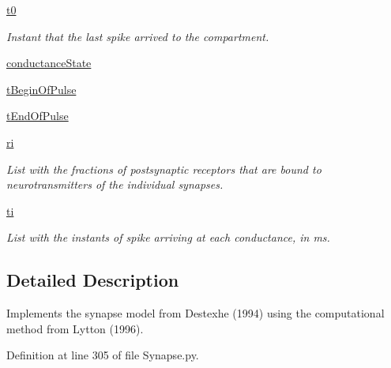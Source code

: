 \begin{DoxyCompactItemize}
\hyperlink{class_synapse_1_1_synapse_ad0adf1cb832bd7ce7918f2779171d7d7}{t0}
\begin{DoxyCompactList}\small\item\em Instant that the last spike arrived to the compartment. \end{DoxyCompactList}\item 
\hyperlink{class_synapse_1_1_synapse_a89d3762daa9c60be63403a5ce9fd9a84}{conductance\-State}
\item 
\hyperlink{class_synapse_1_1_synapse_acdc426c52a2a13183d5f8c54a830bfa2}{t\-Begin\-Of\-Pulse}
\item 
\hyperlink{class_synapse_1_1_synapse_adfd02fa815d45efd0cb1bc0124fe2c90}{t\-End\-Of\-Pulse}
\item 
\hyperlink{class_synapse_1_1_synapse_adc85234a081ad18bf19473be530dcf78}{ri}
\begin{DoxyCompactList}\small\item\em List with the fractions of postsynaptic receptors that are bound to neurotransmitters of the individual synapses. \end{DoxyCompactList}\item 
\hyperlink{class_synapse_1_1_synapse_a714c95723607acad52af96ad55b6c575}{ti}
\begin{DoxyCompactList}\small\item\em List with the instants of spike arriving at each conductance, in ms. \end{DoxyCompactList}\end{DoxyCompactItemize}


\subsection{Detailed Description}
Implements the synapse model from Destexhe (1994) using the computational method from Lytton (1996). 

Definition at line 305 of file Synapse.\-py.



